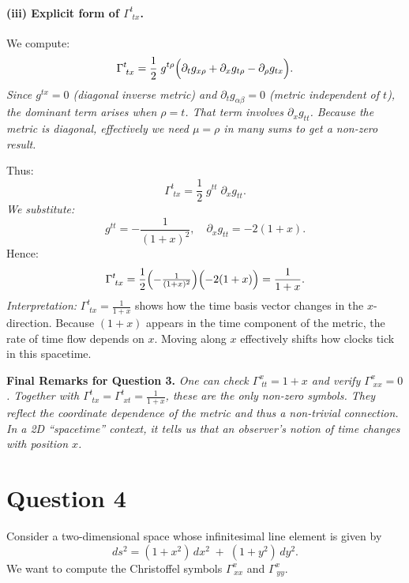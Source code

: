     \paragraph{(iii) Explicit form of \(\Gamma^{t}_{\;tx}\).}

    We compute:
    \[
        \Gamma^{t}_{\;tx}
        =
        \frac{1}{2}\;g^{t\rho}
        \Bigl(
        \partial_t g_{x\rho}
        +
        \partial_x g_{t\rho}
        -
        \partial_\rho g_{tx}
        \Bigr).
    \]
    \emph{Since \(g^{tx} = 0\) (diagonal inverse metric) and \(\partial_t g_{\alpha\beta} = 0\) (metric independent of \(t\)), the dominant term arises when \(\rho = t\). That term involves \(\partial_x g_{tt}\). Because the metric is diagonal, effectively we need \(\mu = \rho\) in many sums to get a non-zero result.}

    Thus:
    \[
        \Gamma^{t}_{\;tx}
        =
        \frac{1}{2}\;g^{tt}\;\partial_x g_{tt}.
    \]
    \emph{We substitute:}
    \[
        g^{tt} = -\frac{1}{(1+x)^2},
        \quad
        \partial_x g_{tt} = -2(1+x).
    \]
    Hence:
    \[
        \Gamma^t_{\;tx}
        =
        \frac12
        \Bigl(-\tfrac{1}{(1+x)^2}\Bigr)
        \Bigl(-2(1+x)\Bigr)
        =
        \frac{1}{1+x}.
    \]
    \emph{Interpretation:}
    \(\Gamma^{t}_{\;tx} = \frac{1}{1+x}\) shows how the time basis vector changes in the \(x\)-direction. Because \((1+x)\) appears in the time component of the metric, the rate of time flow depends on \(x\). Moving along \(x\) effectively shifts how clocks tick in this spacetime.

    \bigskip

    \textbf{Final Remarks for Question 3.}
    \emph{One can check \(\Gamma^x_{\;tt} = 1 + x\) and verify \(\Gamma^x_{\;xx} = 0\). Together with \(\Gamma^t_{\;tx} = \Gamma^t_{\;xt} = \frac{1}{1+x}\), these are the only non-zero symbols. They reflect the coordinate dependence of the metric and thus a non-trivial connection. In a 2D “spacetime” context, it tells us that an observer’s notion of time changes with position \(x\).}


    \section*{Question 4}

    \noindent
    Consider a two-dimensional space whose infinitesimal line element is given by
    \[
        ds^2 = (1 + x^2)\,dx^2 \;+\; (1 + y^2)\,dy^2.
    \]
    We want to compute the Christoffel symbols \(\Gamma^{x}_{\,xx}\) and \(\Gamma^{x}_{\,yy}\).

